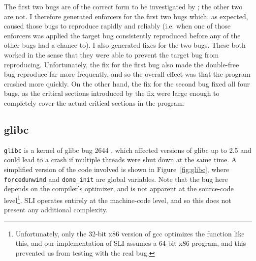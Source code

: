 The first two bugs are of the correct form to be investigated by
{\technique}; the other two are not.  I therefore generated enforcers
for the first two bugs which, as expected, caused those bugs to
reproduce rapidly and reliably (i.e. when one of those enforcers was
applied the target bug consistently reproduced before any of the other
bugs had a chance to).  I also generated fixes for the two bugs.
These both worked in the sense that they were able to prevent the
target bug from reproducing.  Unfortunately, the fix for the first bug
also made the double-free bug reproduce far more frequently, and so
the overall effect was that the program crashed more quickly.  On the
other hand, the fix for the second bug fixed all four bugs, as the
critical sections introduced by the fix were large enough to
completely cover the actual critical sections in the program.



\subsection{glibc}

\verb|glibc| is a kernel of glibc bug 2644 \cite{glibc2644}, which
affected versions of glibc up to 2.5 and could lead to a crash if
multiple threads were shut down at the same time.  A simplified
version of the code involved is shown in Figure~\ref{fig:glibc}, where
\verb|forcedunwind| and \verb|done_init| are global variables.  Note
that the bug here depends on the compiler's optimizer, and is not
apparent at the source-code level\footnote{Unfortunately, only the
  32-bit x86 version of gcc optimizes the function like this, and our
  implementation of SLI assumes a 64-bit x86 program, and this
  prevented us from testing with the real bug.}.  SLI operates
entirely at the machine-code level, and so this does not present any
additional complexity.


